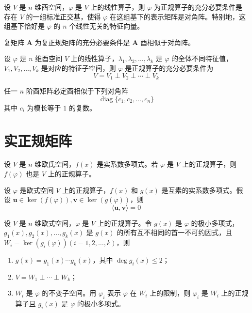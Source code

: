\begin{theorem}
    设 $V$ 是 $n$ 维酉空间，$\varphi $ 是 $V$ 上的线性算子，则 $\varphi$ 为正规算子的充分必要条件是存在 $V$ 的一组标准正交基，使得 $\varphi$ 在这组基下的表示矩阵是对角阵。特别地，这组基下恰好是 $\varphi$ 的 $n$ 个线性无关的特征向量。
\end{theorem}

\begin{theorem}
    复矩阵 $\bm{A}$ 为复正规矩阵的充分必要条件是 $\bm{A}$ 酉相似于对角阵。
\end{theorem}

\begin{proposition}
    设 $\varphi$ 是 $n$ 维酉空间 $V$ 上的线性算子，$\lambda_1, \lambda_2, \ldots, \lambda_k$ 是 $\varphi$ 的全体不同特征值，$V_1, V_2, \ldots, V_k$ 是对应的特征子空间，则 $\varphi$ 是正规算子的充分必要条件为
    \[
        V = V_1 \perp V_2 \perp \cdots \perp V_k
    \]
\end{proposition}

\begin{theorem}
    任一 $n$ 阶酉矩阵必定酉相似于下列对角阵
    \[
        \operatorname{diag}\{c_1, c_2, \ldots, c_n\}
    \]
    其中 $c_i$ 为模长等于 $1$ 的复数。
\end{theorem}
\section{实正规矩阵}

\begin{lemma}
    设 $V$ 是 $n$ 维欧氏空间，$f(x)$ 是实系数多项式。若 $\varphi$ 是 $V$ 上的正规算子，则 $f(\varphi)$ 也是 $V$ 上的正规算子。
\end{lemma}

\begin{lemma}
    设 $\varphi$ 是欧式空间 $V$ 上的正规算子，$f(x)$ 和 $g(x)$ 是互素的实系数多项式。假设 $\bm{u} \in \ker(f(\varphi)), \bm{v} \in \ker(g(\varphi))$，则
    \[
        \langle \bm{u}, \bm{v} \rangle = 0
    \]
\end{lemma}

\begin{theorem}
    设 $V$ 是 $n$ 维欧式空间，$\varphi$ 是 $V$ 上的正规算子。令 $g(x)$ 是 $\varphi$ 的极小多项式，$g_1(x), g_2(x), \ldots, g_k(x)$ 是 $g(x)$ 的所有互不相同的首一不可约因式，且 $W_i = \ker(g_i(\varphi))(i = 1, 2, \ldots, k)$，则
    \begin{enumerate}
        \item $g(x) = g_1(x)\cdots g_k(x)$，其中 $\deg g_i(x) \leqslant 2$；
        \item $V = W_1 \perp \cdots \perp W_k$；
        \item $W_i$ 是 $\varphi$ 的不变子空间。用 $\varphi_i$ 表示 $\varphi$ 在 $W_i$ 上的限制，则 $\varphi_i$ 是 $W_i$ 上的正规算子且 $g_i(x)$ 是 $\varphi$ 的极小多项式。
    \end{enumerate}
\end{theorem}

